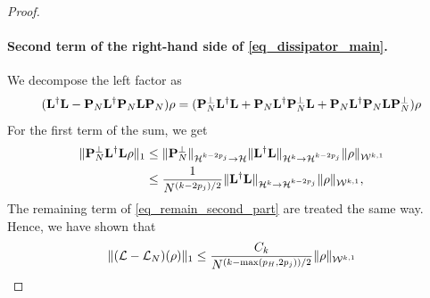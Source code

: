 \documentclass[10pt,a4paper]{amsart}
\newcommand{\oL}{{\bf L}}
\newcommand{\oP}{{\bf P}}
\newcommand{\orho}{{\bf \rho}}
\newcommand{\xH}{\mathcal{H}}
\newcommand{\xL}{\mathcal{L}}
\newcommand{\xW}{\mathcal{W}}
\begin{document}
\begin{proof}
    \paragraph{Second term of the right-hand side of \cref{eq_dissipator_main}.}
    We decompose the left factor as
    \begin{align}
        \label{eq_remain_second_part}
        (\oL^\dag \oL - \oP_N \oL^\dag \oP_N \oL \oP_N)\orho= (\oP_N^\perp \oL^\dag \oL + \oP_N \oL^\dag \oP_N^\perp \oL+ \oP_N \oL^\dag \oP_N \oL \oP_N^\perp)\orho
    \end{align}
    For the first term of the sum, we get
    \begin{align}
        \|\oP_N^\perp \oL^\dag \oL \orho \|_1&\leq \|\oP_N^\perp\|_{\xH^{k-2p_j}\to \xH} \| \oL^\dag \oL\|_{\xH^{k}\to \xH^{k-2p_j}} \|\orho\|_{\xW^{k,1}}\\
        &\leq \frac{1}{N^{(k-2p_j)/2}}\| \oL^\dag \oL\|_{\xH^{k}\to \xH^{k-2p_j}} \|\orho\|_{\xW^{k,1}},
    \end{align}
    The remaining term of \cref{eq_remain_second_part} are treated the same way.
    Hence, we have shown that
    \begin{align}
        \| (\xL-\xL_N)(\orho)\|_1\leq \frac{C_k}{N^{(k-\max (p_H,2p_j))/2}} \|\orho\|_{\xW^{k,1}}
    \end{align}
\end{proof}
\end{document}
